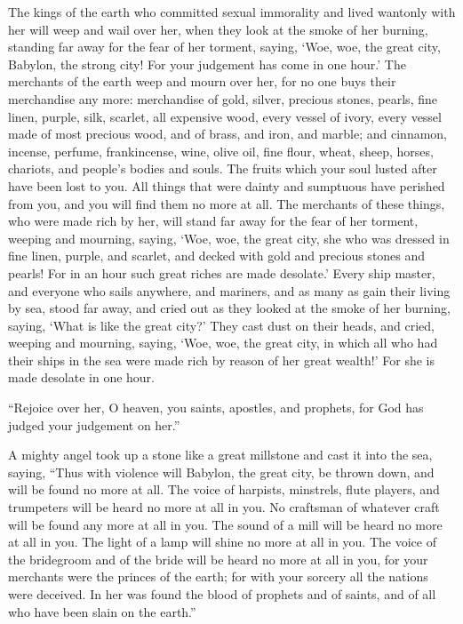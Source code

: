  The kings of the earth who committed sexual immorality
and lived wantonly with her will weep and wail over her, when they look
at the smoke of her burning,  standing far away for the
fear of her torment, saying, `Woe, woe, the great city, Babylon, the
strong city! For your judgement has come in one hour.' 
The merchants of the earth weep and mourn over her, for no one buys
their merchandise any more:  merchandise of gold, silver,
precious stones, pearls, fine linen, purple, silk, scarlet, all
expensive wood, every vessel of ivory, every vessel made of most
precious wood, and of brass, and iron, and marble;  and
cinnamon, incense, perfume, frankincense, wine, olive oil, fine flour,
wheat, sheep, horses, chariots, and people's bodies and souls.
 The fruits which your soul lusted after have been lost
to you. All things that were dainty and sumptuous have perished from
you, and you will find them no more at all.  The
merchants of these things, who were made rich by her, will stand far
away for the fear of her torment, weeping and mourning, 
saying, `Woe, woe, the great city, she who was dressed in fine linen,
purple, and scarlet, and decked with gold and precious stones and
pearls!  For in an hour such great riches are made
desolate.' Every ship master, and everyone who sails anywhere, and
mariners, and as many as gain their living by sea, stood far away,
 and cried out as they looked at the smoke of her
burning, saying, `What is like the great city?'  They
cast dust on their heads, and cried, weeping and mourning, saying, `Woe,
woe, the great city, in which all who had their ships in the sea were
made rich by reason of her great wealth!' For she is made desolate in
one hour.

 ``Rejoice over her, O heaven, you saints, apostles, and
prophets, for God has judged your judgement on her.''

 A mighty angel took up a stone like a great millstone
and cast it into the sea, saying, ``Thus with violence will Babylon, the
great city, be thrown down, and will be found no more at all.
 The voice of harpists, minstrels, flute players, and
trumpeters will be heard no more at all in you. No craftsman of whatever
craft will be found any more at all in you. The sound of a mill will be
heard no more at all in you.  The light of a lamp will
shine no more at all in you. The voice of the bridegroom and of the
bride will be heard no more at all in you, for your merchants were the
princes of the earth; for with your sorcery all the nations were
deceived.  In her was found the blood of prophets and of
saints, and of all who have been slain on the earth.''

